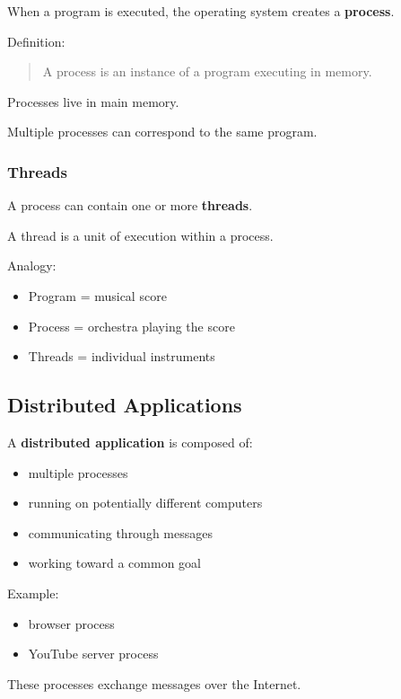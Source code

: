 When a program is executed, the operating system creates a \textbf{process}.

Definition:

\begin{quote}
A process is an instance of a program executing in memory.
\end{quote}

Processes live in main memory.

Multiple processes can correspond to the same program.

\subsubsection{Threads}

A process can contain one or more \textbf{threads}.

A thread is a unit of execution within a process.

Analogy:

\begin{itemize}
\item Program = musical score
\item Process = orchestra playing the score
\item Threads = individual instruments
\end{itemize}

\subsection{Distributed Applications}

A \textbf{distributed application} is composed of:

\begin{itemize}
\item multiple processes
\item running on potentially different computers
\item communicating through messages
\item working toward a common goal
\end{itemize}

Example:

\begin{itemize}
\item browser process
\item YouTube server process
\end{itemize}

These processes exchange messages over the Internet.


